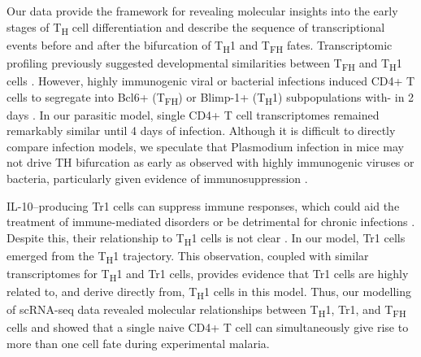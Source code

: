Our data provide the framework for revealing molecular insights into the early stages of T\textsubscript{H} cell differentiation and describe the sequence of transcriptional events before and after the bifurcation of T\textsubscript{H}1 and T\textsubscript{FH} fates. Transcriptomic profiling previously suggested developmental similarities between T\textsubscript{FH} and T\textsubscript{H}1 cells \cite{Liu2012-vw}. However, highly immunogenic viral or bacterial infections induced CD4+ T cells to segregate into Bcl6+ (T\textsubscript{FH}) or Blimp-1+ (T\textsubscript{H}1) subpopulations with- in 2 days \cite{Choi2011-ym, Pepper2011-mm}. In our parasitic model, single CD4+ T cell transcriptomes remained remarkably similar until 4 days of infection. Although it is difficult to directly compare infection models, we speculate that Plasmodium infection in mice may not drive TH bifurcation as early as observed with highly immunogenic viruses or bacteria, particularly given evidence of immunosuppression \cite{Haque2014-sq}.

IL-10–producing Tr1 cells can suppress immune responses, which could aid the treatment of immune-mediated disorders \cite{Clemente-Casares2016-pg} or be detrimental for chronic infections \cite{Couper2008-fc}. Despite this, their relationship to T\textsubscript{H}1 cells is not clear \cite{Apetoh2010-ri}. In our model, Tr1 cells emerged from the T\textsubscript{H}1 trajectory. This observation, coupled with similar transcriptomes for T\textsubscript{H}1 and Tr1 cells, provides evidence that Tr1 cells are highly related to, and derive directly from, T\textsubscript{H}1 cells in this model. Thus, our modelling of scRNA-seq data revealed molecular relationships between T\textsubscript{H}1, Tr1, and T\textsubscript{FH} cells and showed that a single naive CD4+ T cell can simultaneously give rise to more than one cell fate during experimental malaria.


